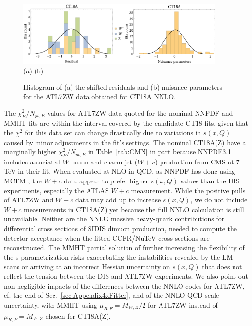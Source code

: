 \begin{figure}[p]
\includegraphics[width=0.49\textwidth]{fig/ATL7WZ/pResidual_CT18A_ATL7WZ.pdf}\quad \includegraphics[width=0.44\textwidth]{fig/ATL7WZ/Nuisance_CT18A_ATL7WZ.pdf}\\
(a)\hspace{2in} (b)
	\caption{
		Histogram of (a) the shifted residuals and (b) nuisance parameters for the ATL7ZW data obtained for CT18A NNLO.
	}
\label{fig:248_hist}
\end{figure}

The $\chi^{2}_E/N_{pt,E}$ values for ATL7ZW data
quoted for the nominal NNPDF and MMHT fits are within the interval
covered by the candidate CT18 fits, given that the $\chi^2$ for this
data set can change drastically due to variations in $s(x,Q)$ caused
by minor adjustments in the fit's settings. The
nominal CT18A(Z) have a marginally higher $\chi^2_E/N_{pt,E}$ in
Table~\ref{tab:CMN} in part because 
NNPDF3.1 includes associated $W$-boson and charm-jet ($W+c$)
production from CMS at 7 TeV \cite{Chatrchyan:2013uja} in their
fit. When evaluated at NLO in QCD, as NNPDF has done using
MCFM \cite{Campbell:2010ff}, the $W+c$ data appear to prefer higher
$s(x,Q)$ values than the DIS experiments, especially the ATLAS $W+c$
measurement. While the positive pulls of ATL7ZW and $W+c$ data may add
up to increase $s(x,Q)$, we do not 
include $W+c$ measurements in CT18A(Z) yet because the full NNLO
calculation is still unavailable.
Neither are the NNLO massive heavy-quark
contributions for differential cross
sections of SIDIS dimuon production, needed to compute the detector acceptance when the fitted CCFR/NuTeV cross sections are reconstructed. 
The MMHT partial solution of further increasing the flexibility of the $s$ parametrization risks exacerbating the instabilities revealed by the LM scans or arriving at an incorrect Hessian uncertainty on $s(x,Q)$ that does not reflect the tension between the DIS and ATL7ZW experiments. We also point out non-negligible impacts of the differences between
the NNLO codes for ATL7ZW, cf. the end of Sec.~\ref{sec:Appendix4xFitter},
and of the NNLO QCD scale uncertainty,
with MMHT using $\mu_{R,F}=M_{W,Z}/2$ for ATL7ZW instead of 
$\mu_{R,F}=M_{W,Z}$ chosen for CT18A(Z).

